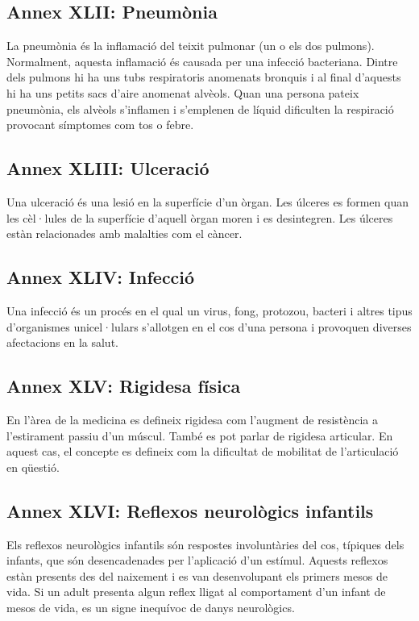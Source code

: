 \documentclass[a4paper,12pt]{article}
\begin{document}
\subsection*{Annex XLII: Pneumònia}
La pneumònia és la inflamació del teixit pulmonar (un o els dos pulmons). Normalment, aquesta inflamació és causada per una infecció bacteriana. Dintre dels pulmons hi ha uns tubs respiratoris anomenats bronquis i al final d'aquests hi ha uns petits sacs d'aire anomenat alvèols. Quan una persona pateix pneumònia, els alvèols s'inflamen i s'emplenen de líquid dificulten la respiració provocant símptomes com tos o febre.
\subsection*{Annex XLIII: Ulceració}
Una ulceració és una lesió en la superfície d'un òrgan. Les úlceres es formen quan les cèl·lules de la superfície d'aquell òrgan moren i es desintegren. Les úlceres estàn relacionades amb malalties com el càncer.
\subsection*{Annex XLIV: Infecció}
Una infecció és un procés en el qual un virus, fong, protozou, bacteri i altres tipus d'organismes unicel·lulars s'allotgen en el cos d'una persona i provoquen diverses afectacions en la salut.
\subsection*{Annex XLV: Rigidesa física}
En l'àrea de la medicina es defineix rigidesa com l'augment de resistència a l'estirament passiu d'un múscul. També es pot parlar de rigidesa articular. En aquest cas, el concepte es defineix com la dificultat de mobilitat de l'articulació en qüestió.
\subsection*{Annex XLVI: Reflexos neurològics infantils}
Els reflexos neurològics infantils són respostes involuntàries del cos, típiques dels infants, que són desencadenades per l'aplicació d'un estímul. Aquests reflexos estàn presents des del naixement i es van desenvolupant els primers mesos de vida. Si un adult presenta algun reflex lligat al comportament d'un infant de mesos de vida, es un signe inequívoc de danys neurològics.
\end{document}
